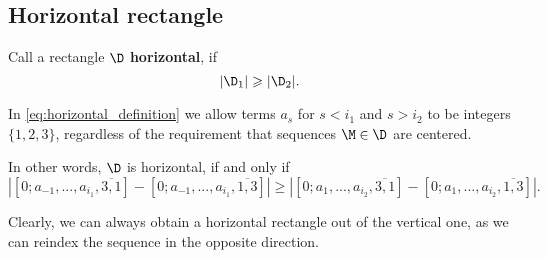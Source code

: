\subsection{Horizontal rectangle}

\begin{definition}
	Call a rectangle $\D$ \textbf{horizontal}, if
	\begin{equation}
		\label{eq:horizontal_definition}
		|\D_1| \geqslant |\D_2|.
	\end{equation}
\end{definition}

In \ref{eq:horizontal_definition} we allow terms $a_s$ for $s < i_1$ and $s > i_2$
to be integers $\{1, 2, 3\}$,
regardless of the requirement that sequences $\M \in \D$ are centered.

In other words, $\D$ is horizontal, if and only if
\begin{equation*}
	\left|
		\left[ 0; a_{-1}, ..., a_{i_1}, \overline{3, 1} \right] - 
		\left[ 0; a_{-1}, ..., a_{i_1}, \overline{1, 3} \right]
	\right| \geqslant \left|
		\left[ 0; a_{1}, ..., a_{i_2}, \overline{3, 1} \right] -
		\left[ 0; a_{1}, ..., a_{i_2}, \overline{1, 3} \right]
	\right|.
\end{equation*}

Clearly, we can always obtain a horizontal rectangle out of the vertical one,
as we can reindex the sequence in the opposite direction.
